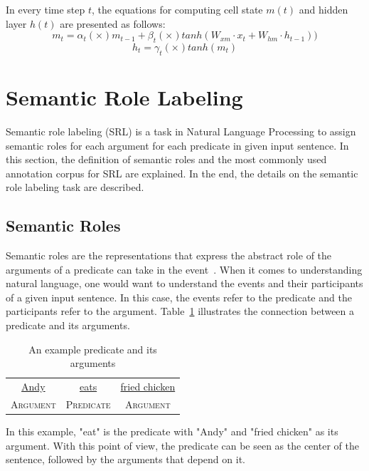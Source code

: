 In every time step $t$, the equations for computing cell state $m(t)$ and hidden layer $h(t)$ are presented as follows:
\begin{equation}\label{eq:mt}
m_{t}=\alpha_{t} (\times) m_{t-1} + \beta_{t} (\times) tanh(W_{xm} \cdot x_{t} + W_{hm} \cdot h_{t-1}))
\end{equation}
\begin{equation}\label{eq:ht}
h_{t}=\gamma_{t} (\times) tanh(m_{t})
\end{equation}

\section{Semantic Role Labeling}
Semantic role labeling (SRL) is a task in Natural Language Processing to assign semantic roles for each argument for each predicate in given input sentence. In this section, the definition of semantic roles and the most commonly used annotation corpus for SRL are explained. In the end, the details on the semantic role labeling task are described.

\subsection{Semantic Roles}
Semantic roles are the representations that express the abstract role of the arguments of a predicate can take in the event~\citep{jurafsky2016speech}. When it comes to understanding natural language, one would want to understand the events and their participants of a given input sentence. In this case, the events refer to the predicate and the participants refer to the argument. Table~\ref{tab:examplesrl1} illustrates the connection between a predicate and its arguments.

\begin{table}
	\centering
	\caption{An example predicate and its arguments}
	\label{tab:examplesrl1}
	\begin{tabular}{|ccc|}
		\hline
		\underline{Andy} & \underline{eats} & \underline{fried chicken} \\
		\textsc{Argument} & \textsc{Predicate} & \textsc{Argument} \\
		\hline
	\end{tabular}
\end{table}

In this example, "eat" is the predicate with "Andy" and "fried chicken" as its argument. With this point of view, the predicate can be seen as the center of the sentence, followed by the arguments that depend on it.

